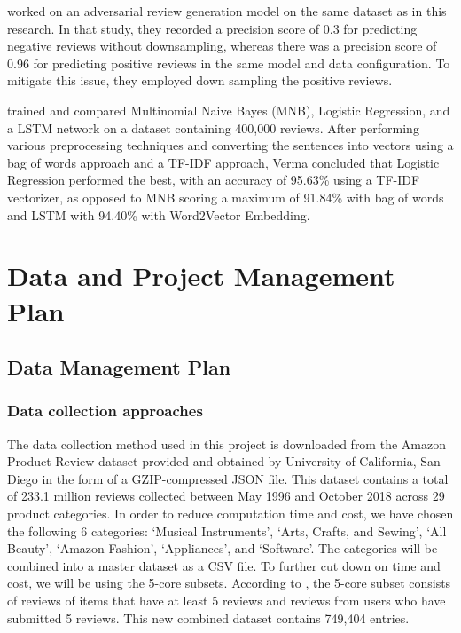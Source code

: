 \documentclass[stu,12pt,floatsintext]{apa7}
\let\oldsection\section
\renewcommand{\section}{\newpage\oldsection}
\begin{document}
\textcite{zhu2018adversarial} worked on an adversarial review generation model on the same dataset as in this research. In that study, they recorded a precision score of 0.3 for predicting negative reviews without downsampling, whereas there was a precision score of 0.96 for predicting positive reviews in the same model and data configuration. To mitigate this issue, they employed down sampling the positive reviews.

\textcite{verma2022sentiment} trained and compared Multinomial Naive Bayes (MNB), Logistic Regression, and a LSTM network on a dataset containing 400,000 reviews. After performing various preprocessing techniques and converting the sentences into vectors using a bag of words approach and a TF-IDF approach, Verma concluded that Logistic Regression performed the best, with an accuracy of 95.63\% using a TF-IDF vectorizer, as opposed to MNB scoring a maximum of 91.84\% with bag of words and LSTM with 94.40\% with Word2Vector Embedding.

\section{Data and Project Management Plan}

\subsection{Data Management Plan}
\subsubsection{Data collection approaches}
The data collection method used in this project is downloaded from the Amazon Product Review dataset provided and obtained by University of California, San Diego in the form of a GZIP-compressed JSON file. This dataset contains a total of 233.1 million reviews collected between May 1996 and October 2018 across 29 product categories. In order to reduce computation time and cost, we have chosen the following 6 categories: `Musical Instruments', `Arts, Crafts, and Sewing', `All Beauty', `Amazon Fashion', `Appliances', and `Software'. The categories will be combined into a master dataset as a CSV file. To further cut down on time and cost, we will be using the 5-core subsets. According to \textcite{ni2019justifying_dataset}, the 5-core subset consists of reviews of items that have at least 5 reviews and reviews from users who have submitted 5 reviews. This new combined dataset contains 749,404 entries.
\end{document}
